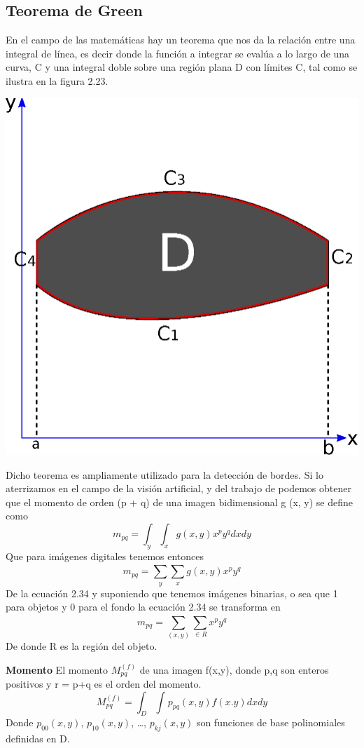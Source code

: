 \subsection{Teorema de Green}
En el campo de las matemáticas hay un teorema que nos da la relación entre una integral
de línea, es decir donde la función a integrar se evalúa a lo largo de una curva, C y una
integral doble sobre una región plana D con límites C, tal como se ilustra en la figura 2.23.
\begin{center}
	\includegraphics[width=0.5 \textwidth]{Contenido/Cuerpo/Capitulo2/Fig18.eps}
	\label{fig:MarcoTeorico:Fig25}
\end{center}
Dicho teorema es ampliamente utilizado para la detección de bordes. Si lo aterrizamos
en el campo de la visión artificial, y del trabajo de \cite{Paper::Lauren1994} podemos
obtener que el momento de orden (p + q) de una imagen bidimensional g (x, y) se define
como
\begin{equation}
	m_{pq} = \int_{y}^{} \int_{x}^{} g(x,y) x^p y^q dx dy
\end{equation}
Que para imágenes digitales tenemos entonces
\begin{equation}
	m_{pq} = \sum_{y}^{}\sum_{x}^{} g(x,y) x^p y^q
\end{equation}
De la ecuación 2.34 y suponiendo que tenemos imágenes binarias, o sea que 1 para objetos
y 0 para el fondo la ecuación 2.34 se transforma en
\begin{equation}
	m_{pq} = \sum_{(x,y)}^{}\sum_{\in R}^{}  x^p y^q
\end{equation}
De donde R es la región del objeto.
\begin{definition}{\textbf{Momento}}
	El momento $M_{pq}^{(f)}$ de una imagen f(x,y), donde p,q son enteros positivos y r = p+q es
	el orden del momento.
	\begin{equation}
		M_{pq}^{(f)} = \int_{D}^{} \int_{}^{} p_{pq}(x,y) f(x.y) dxdy
	\end{equation}
    Donde $p_{00}(x,y)$, $p_{10}(x,y)$, \dots, $p_{kj}(x,y)$ son funciones de base polinomiales
    definidas en D.
\end{definition}

